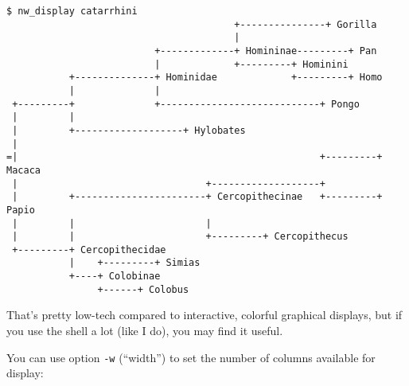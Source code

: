 \documentclass[a4paper,10pt]{report}
\begin{document}
\begin{samepage}
\begin{verbatim}
$ nw_display catarrhini
                                        +---------------+ Gorilla               
                                        |                                       
                          +-------------+ Homininae---------+ Pan               
                          |             +---------+ Hominini                    
           +--------------+ Hominidae             +---------+ Homo              
           |              |                                                     
 +---------+              +----------------------------+ Pongo                  
 |         |                                                                    
 |         +-------------------+ Hylobates                                      
 |                                                                              
=|                                                     +---------+ Macaca       
 |                                 +-------------------+                        
 |         +-----------------------+ Cercopithecinae   +---------+ Papio        
 |         |                       |                                            
 |         |                       +---------+ Cercopithecus                    
 +---------+ Cercopithecidae                                                    
           |    +---------+ Simias                                              
           +----+ Colobinae                                                     
                +------+ Colobus       
\end{verbatim}
\end{samepage}

That's pretty low-tech compared to interactive, colorful graphical displays, but if you use the shell a lot (like I do), you may find it useful.

You can use option \texttt{-w} (``width'') to set the number of columns available for display:
\end{document}
